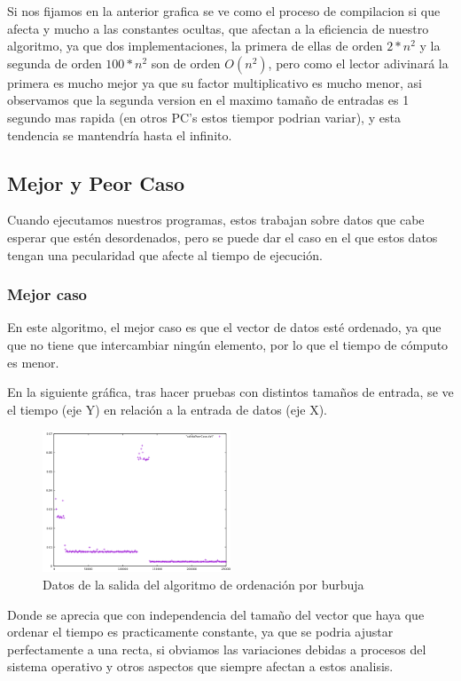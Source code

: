 Si nos fijamos en la anterior grafica se ve como el proceso de compilacion si que afecta y mucho a las constantes ocultas, que afectan a la eficiencia de nuestro algoritmo, ya que dos implementaciones, la primera de ellas de orden $2*n^{2}$ y la segunda de orden $100*n^{2}$ son de orden $O(n^{2})$, pero como el lector adivinará la primera es mucho mejor ya que su factor multiplicativo es mucho menor, asi observamos que la segunda version en el maximo tamaño de entradas es 1 segundo mas rapida (en otros PC's estos tiempor podrian variar), y esta tendencia se mantendría hasta el infinito.

\subsection{Mejor y Peor Caso}

Cuando ejecutamos nuestros programas, estos trabajan sobre datos que cabe esperar que estén desordenados, pero se puede dar el caso en el que estos datos tengan una pecularidad que afecte al tiempo de ejecución.

\subsubsection{Mejor caso}

En este algoritmo, el mejor caso es que el vector de datos esté ordenado, ya que que no tiene que intercambiar ningún elemento, por lo que el tiempo de cómputo es menor.

En la siguiente gráfica, tras hacer pruebas con distintos tamaños de entrada, se ve el tiempo (eje Y) en relación a la entrada de datos (eje X).

\begin{figure}[ht]
  \centering
  \includegraphics[width=0.5\textwidth]{./Imagenes/mejorCaso.png}
  \caption{Datos de la salida del algoritmo de ordenación por burbuja}
\end{figure}

Donde se aprecia que con independencia del tamaño del vector que haya que ordenar el tiempo es practicamente constante, ya que se podria ajustar perfectamente a una recta, si obviamos las variaciones debidas a procesos del sistema operativo y otros aspectos que siempre afectan a estos analisis.

